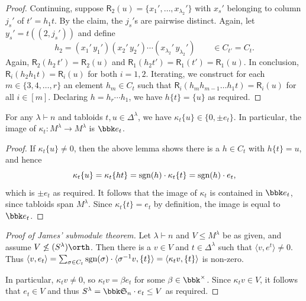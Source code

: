 \begin{lemma}
\begin{proof}
        Continuing, suppose $\mathsf{R}_2(u)=\{x_1',\ldots, x_{\lambda_2}'\}$
        with $x_s'$ belonging to column $j_s'$ of $t'=h_1t$. By the claim, the
        $j_s'$s are pairwise
        distinct. Again, let $y_s'=t((2,j_s'))$ and define
        \[h_2=(x_1'\,y_1')(x_2'\,y_2')\cdots(x_{\lambda_2}'\,y_{\lambda_2}') \qquad\in C_{t'}=C_t.\]
        Again, $\mathsf{R}_2(h_2\,t')=\mathsf{R}_2(u)$ and
        $\mathsf{R}_1(h_2t')=\mathsf{R}_1(t')=\mathsf{R}_1(u)$. In conclusion,
        $\mathsf{R}_i(h_2h_1t)=\mathsf{R}_i(u)$ for
        both $i=1,2$. Iterating, we construct for each $m\in \{3,4,\ldots, r\}$
        an element $h_m\in C_t$ such that $\mathsf{R}_i(h_mh_{m-1}\ldots h_1
        t)=\mathsf{R}_i(u)$ for all $i\in [m]$. Declaring $h=h_r\cdots h_1$, we
        have $h\{t\}=\{u\}$ as required.
    \end{proof}
\end{lemma}

\begin{proposition}
    \label{prop:kappaaction}
    For any $\lambda\vdash n$ and tabloids $t,u\in \Delta^\lambda$, we have
    $\kappa_t\{u\}\in \{0,\pm e_t\}$. In particular, the image of $\kappa_t\colon
    M^\lambda\to M^\lambda$ is $\bbk e_t$.

    \begin{proof}
        If $\kappa_t\{u\}\neq 0$, then the above lemma shows there is a $h\in
        C_t$ with $h\{t\}=u$, and hence
        \[\kappa_t\{u\}=\kappa_t \{ht\}=\textnormal{sgn}(h)\cdot \kappa_t\{t\} =
        \textnormal{sgn}(h)\cdot e_t,\]
        which is $\pm e_t$ as required. It follows that the image of $\kappa_t$
        is contained in $\bbk e_t$, since tabloids span $M^\lambda$.
        Since $\kappa_t\{t\}=e_t$ by definition, the image is equal to $\bbk
        e_t$.
    \end{proof}
\end{proposition}

\begin{proof}[Proof of James' submodule theorem]
    Let $\lambda\vdash n$ and $V\leq M^\lambda$ be as given, and assume
    $V\not\leq (S^\lambda)\orth$. Then there is a $v\in V$ and $t\in
    \Delta^\lambda$ such that $\langle v, e^t\rangle\neq 0$. Thus $\langle v,
    e_t\rangle = \sum_{\sigma\in C_t} \textnormal{sgn} (\sigma)\cdot \langle \sigma^{-1}v,
    \{t\}\rangle = \langle \kappa_t v, \{t\}\rangle$ is non-zero.

    In particular, $\kappa_t v\neq 0$, so $\kappa_t v = \beta e_t$ for some
    $\beta\in \bbk^\times$. Since $\kappa_t v\in V$, it follows that $e_t\in V$
    and thus $S^\lambda = \bbk \sym{n} \cdot e_t \leq V$ as required.
\end{proof}

